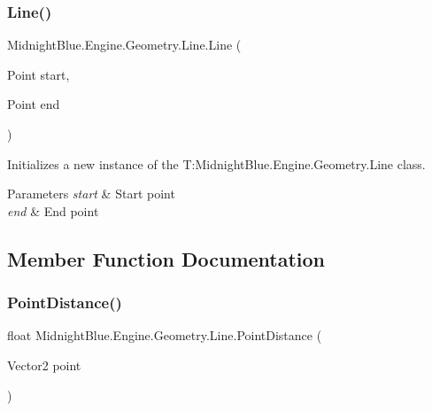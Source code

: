 \subsubsection{\texorpdfstring{Line()}{Line()}\hspace{0.1cm}{\footnotesize\ttfamily [2/2]}}
{\footnotesize\ttfamily Midnight\+Blue.\+Engine.\+Geometry.\+Line.\+Line (\begin{DoxyParamCaption}\item[{Point}]{start,  }\item[{Point}]{end }\end{DoxyParamCaption})\hspace{0.3cm}{\ttfamily [inline]}}



Initializes a new instance of the T\+:\+Midnight\+Blue.\+Engine.\+Geometry.\+Line class. 


\begin{DoxyParams}{Parameters}
{\em start} & Start point\\
\hline
{\em end} & End point\\
\hline
\end{DoxyParams}


\subsection{Member Function Documentation}
\hypertarget{class_midnight_blue_1_1_engine_1_1_geometry_1_1_line_a635a797ebd3d805977df591277a444f3}{}\label{class_midnight_blue_1_1_engine_1_1_geometry_1_1_line_a635a797ebd3d805977df591277a444f3} 
\subsubsection{\texorpdfstring{Point\+Distance()}{PointDistance()}\hspace{0.1cm}{\footnotesize\ttfamily [1/2]}}
{\footnotesize\ttfamily float Midnight\+Blue.\+Engine.\+Geometry.\+Line.\+Point\+Distance (\begin{DoxyParamCaption}\item[{Vector2}]{point }\end{DoxyParamCaption})\hspace{0.3cm}{\ttfamily [inline]}}



